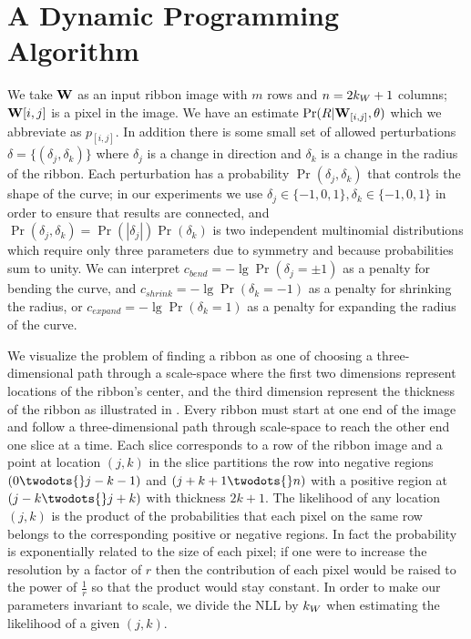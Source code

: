 \section{A Dynamic Programming Algorithm}

We take $\mathbf{W}{}$ as an input ribbon image with $m$ rows and $n=2k_W+1$ columns; $\mathbf{W}{}{[i,j]}$ is a pixel in the image. 
We have an estimate $\Pr(R|\mathbf{W}{}_{[i,j]}, \theta)$ which we abbreviate as $p_{[i,j]}$. 
In addition there is some small set of allowed perturbations $\delta=\{(\delta_j, \delta_k)\}$ where $\delta_j$ is a change in direction and $\delta_k$ is a change in the radius of the ribbon. 
Each perturbation has a probability $\Pr(\delta_j, \delta_k)$ that controls the shape of the curve; in our experiments we use $\delta_j\in\{-1,0,1\}, \delta_k\in\{-1, 0,1\}$ in order to ensure that results are connected, and  $\Pr(\delta_j, \delta_k)=\Pr(|\delta_j|)\Pr(\delta_k)$ is two independent multinomial distributions which require only three parameters due to symmetry and because probabilities sum to unity. 
We can interpret $c_\mathit{bend}=-\lg \Pr(\delta_j=\pm1)$ as a penalty for bending the curve, and $c_\mathit{shrink}=-\lg \Pr(\delta_k=-1)$ as a penalty for shrinking the radius, or $c_\mathit{expand} = -\lg \Pr(\delta_k=1)$ as a penalty for expanding the radius of the curve. 


We visualize the problem of finding a ribbon as one of choosing a three-dimensional path through a scale-space where the first two dimensions represent locations of the ribbon's center, and the third dimension represent the thickness of the ribbon as illustrated in . Every ribbon must start at one end of the image and follow a three-dimensional path through scale-space to reach the other end one slice at a time. Each slice corresponds to a row of the ribbon image and a point at location $(j, k)$ in the slice partitions the row into negative regions $(0\twodots{}j-k-1)$ and $(j+k+1\twodots{}n)$ with a positive region at $(j-k \twodots{} j+k)$ with thickness $2k+1$. The likelihood of any location $(j, k)$ is the product of the probabilities that each pixel on the same row belongs to the corresponding positive or negative regions.  In fact the probability is exponentially related to the size of each pixel; if one were to increase the resolution by a factor of $r$ then the contribution of each pixel would be raised to the power of $\frac{1}{r}$ so that the product would stay constant. In order to make our parameters invariant to scale, we divide the \ac{NLL} by $k_W{}$ when estimating the likelihood of a given $(j,k)$. 


